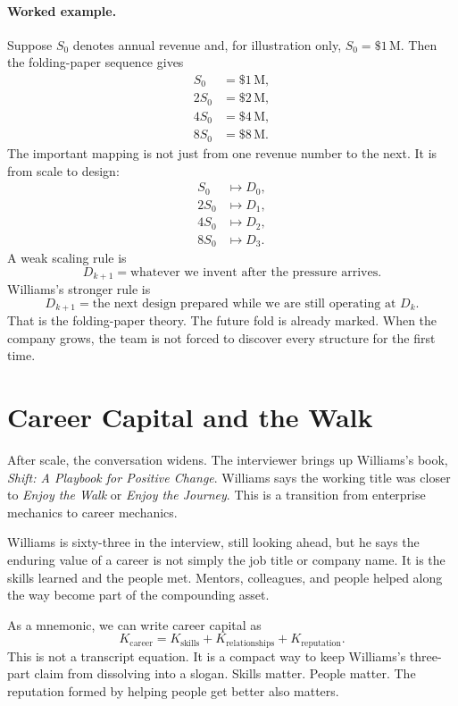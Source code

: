 \paragraph{Worked example.} Suppose \(S_0\) denotes annual revenue and, for illustration only, \(S_0=\$1\,\mathrm{M}\). Then the folding-paper sequence gives
\begin{align}
S_0 &= \$1\,\mathrm{M},\\
2S_0 &= \$2\,\mathrm{M},\\
4S_0 &= \$4\,\mathrm{M},\\
8S_0 &= \$8\,\mathrm{M}.
\end{align}
The important mapping is not just from one revenue number to the next. It is from scale to design:
\begin{align}
S_0 &\mapsto D_0,\\
2S_0 &\mapsto D_1,\\
4S_0 &\mapsto D_2,\\
8S_0 &\mapsto D_3.
\end{align}
A weak scaling rule is
\begin{equation}
D_{k+1}=\text{whatever we invent after the pressure arrives}.
\end{equation}
Williams's stronger rule is
\begin{equation}
D_{k+1}=\text{the next design prepared while we are still operating at }D_k.
\end{equation}
That is the folding-paper theory. The future fold is already marked. When the company grows, the team is not forced to discover every structure for the first time.

\section{Career Capital and the Walk}

After scale, the conversation widens. The interviewer brings up Williams's book, \emph{Shift: A Playbook for Positive Change}. Williams says the working title was closer to \emph{Enjoy the Walk} or \emph{Enjoy the Journey}. This is a transition from enterprise mechanics to career mechanics.

Williams is sixty-three in the interview, still looking ahead, but he says the enduring value of a career is not simply the job title or company name. It is the skills learned and the people met. Mentors, colleagues, and people helped along the way become part of the compounding asset.

As a mnemonic, we can write career capital as
\begin{equation}
K_{\mathrm{career}}
=
K_{\mathrm{skills}}
+
K_{\mathrm{relationships}}
+
K_{\mathrm{reputation}}.
\end{equation}
This is not a transcript equation. It is a compact way to keep Williams's three-part claim from dissolving into a slogan. Skills matter. People matter. The reputation formed by helping people get better also matters.


